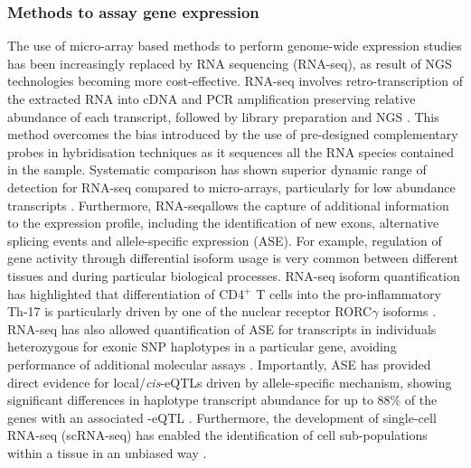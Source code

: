 \subsubsection{Methods to assay gene expression}
The use of micro-array based methods to perform genome-wide expression studies has been increasingly replaced by RNA sequencing (RNA-seq), as result of NGS technologies becoming more cost-effective. RNA-seq involves retro-transcription of the extracted RNA into cDNA and PCR amplification preserving relative abundance of each transcript, followed by library preparation and NGS \parencite{Mortazavi2008}. This method overcomes the bias introduced by the use of pre-designed complementary probes in hybridisation techniques as it sequences all the RNA species contained in the sample. Systematic comparison has shown superior dynamic range of detection for RNA-seq compared to micro-arrays, particularly for low abundance transcripts \parencite{Zhao2014}. Furthermore, RNA-seqallows the capture of additional information to the expression profile, including the identification of new exons, alternative splicing events and allele-specific expression (ASE). For example, regulation of gene activity through differential isoform usage is very common between different tissues and during particular biological processes. RNA-seq isoform quantification has highlighted that differentiation of CD4$^+$ T cells into the pro-inflammatory Th-17 is particularly driven by one of the nuclear receptor RORC$\gamma$ isoforms \parencite{Zhao2014}. %
RNA-seq has also allowed quantification of ASE for transcripts in individuals heterozygous for exonic SNP haplotypes in a particular gene, avoiding performance of additional molecular assays \parencite{Yan2002}. Importantly, ASE has provided direct evidence for local/\textit{cis}-eQTLs driven by allele-specific mechanism, showing significant differences in haplotype transcript abundance for up to 88\% of the genes with an associated -eQTL \parencite{Pickrell2010}. Furthermore, the development of single-cell RNA-seq (scRNA-seq) has enabled the identification of cell sub-populations within a tissue in an unbiased way \parencite{Tang2009, Tang2010}. 

